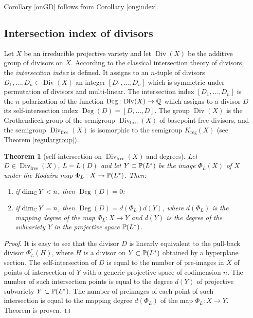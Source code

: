 \documentclass[11pt]{article}
\theoremstyle{plain}
\newtheorem{theorem}{Theorem}[section]
\theoremstyle{definition}
\newcommand\Div{\operatorname{Div}}
\newcommand\D{\operatorname{Deg}}
\begin{document}
Corollary \ref{onGD} follows from Corollary \ref{ongindex}.


\subsection{Intersection index of  divisors}

Let $X$ be an irreducible  projective variety and let $\Div (X)$ be the additive group of  divisors on $X$. According to the classical intersection theory of  divisors, the {\it intersection index} is defined. It assigns to an $n$-tuple of divisors $D_1,\dots,D_n\in \Div (X)$ an integer $[D_1,\dots,D_n]$ which is symmetric under permutation of divisors and multi-linear. The intersection index $[D_1,\dots,D_n]$ is the $n$-polarization of the function $\D:\Div(X)\to
\Bbb Q$ which assigns to a divisor $D$ its self-intersection index $\D(D)=[D,\dots,D]$.
The group $\Div (X)$
is the Grothendieck group of the semigroup $\Div_\mathrm{free}(X)$ of basepoint free  divisors, and the semigroup $\Div_\mathrm{free}(X)$ is isomorphic to the semigroup $K_\mathrm{reg}(X)$ (see Theorem \ref{regulargroup}).

\begin{theorem}[self-intersection on $\Div_\mathrm{free}(X)$ and degrees]\label{selfdivisor} Let $D\in \Div_\mathrm{free}(X)$, $L=L(D)$ and let  $Y\subset \Bbb P(L^*)$ be  the image $\Phi_L(X)$ of $X$ under the Kodaira map $\Phi_L:X\to \Bbb P(L^*)$.  Then:

\begin{enumerate}\item if $\dim_{\Bbb C}Y<n$, then $\D(D)=0$;
\item if $\dim_{\Bbb C}Y=n$, then $\D(D)=d(\Phi_L)d(Y)$, where $d(\Phi _L)$ is the mapping degree of the map $\Phi_L:X\to Y$ and $d(Y)$ is the degree of the subvariety $Y$ in the projective space $\Bbb P(L^*)$.
    \end{enumerate}
\end{theorem}

\begin{proof} It is easy to see  that the divisor $D$ is linearly  equivalent to the pull-back divisor $\Phi_L^* (H)$, where $H$ is a divisor on $Y\subset \Bbb P (L^*)$ obtained by a hyperplane section. The self-intersection of $D$ is equal to the number of pre-images in $X$ of points of intersection of $Y$ with a generic projective space of codimension $n$. The number of such intersection points is equal to the degree $d(Y)$ of projective subvariety $Y\subset \Bbb P(L^*)$. The number of preimages of each point of such intersection is equal to the mapping degree  $d(\Phi_L)$ of the map $\Phi_L:X\to Y$. Theorem is proven.
\end{proof}
\end{document}

